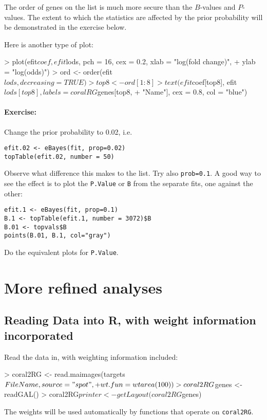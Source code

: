 \documentclass[a4paper,9pt]{article}
\begin{document}
The order of genes on the list is much more secure than the $B$-values
and $P$-values.  The extent to which the statistics are affected by the
prior probability will be demonstrated in the exercise below.  

Here is another type of plot:
\begin{Schunk}
\begin{Sinput}
> plot(efit$coef, efit$lods, pch = 16, cex = 0.2, xlab = "log(fold change)", 
+     ylab = "log(odds)")
> ord <- order(efit$lods, decreasing = TRUE)
> top8 <- ord[1:8]
> text(efit$coef[top8], efit$lods[top8], labels = coralRG$genes[top8, 
+     "Name"], cex = 0.8, col = "blue")
\end{Sinput}
\end{Schunk}

\paragraph{Exercise:} Change the prior probability to 0.02, i.e.
\begin{verbatim}
efit.02 <- eBayes(fit, prop=0.02)
topTable(efit.02, number = 50)
\end{verbatim}
Observe what difference this makes to the list.  Try also \texttt{prob=0.1}.
A good way to see the effect is to plot the \texttt{P.Value} or \texttt{B}
from the separate fits, one against the other:
\begin{verbatim}
efit.1 <- eBayes(fit, prop=0.1)
B.1 <- topTable(efit.1, number = 3072)$B
B.01 <- topvals$B
points(B.01, B.1, col="gray")
\end{verbatim}

Do the equivalent plots for \texttt{P.Value}.

\section{More refined analyses}
\subsection{Reading Data into R, with weight information incorporated}

Read the data in, with weighting information included:
\begin{Schunk}
\begin{Sinput}
> coral2RG <- read.maimages(targets$FileName, source = "spot", 
+     wt.fun = wtarea(100))
> coral2RG$genes <- readGAL()
> coral2RG$printer <- getLayout(coral2RG$genes)
\end{Sinput}
\end{Schunk}
The weights will be used automatically by functions that operate
on \texttt{coral2RG}.
\end{document}
